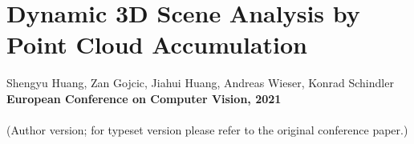 \chapter[Dynamic 3D Scene Analysis by Point Cloud Accumulation]{Dynamic 3D Scene Analysis by Point Cloud Accumulation}
\label{chap:eccv22}

Shengyu Huang, Zan Gojcic, Jiahui Huang, Andreas Wieser, Konrad Schindler\\
\textbf{European Conference on Computer Vision, 2021}\\
\\
(Author version; for typeset version please refer to the original conference paper.)\\

\providecommand{\subdir}{.}
\graphicspath{{\subdir/}}





\newpage





% 



\newpage
